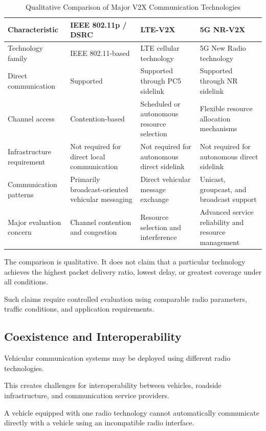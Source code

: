 \begin{table}[t]
\centering
\caption{Qualitative Comparison of Major V2X Communication Technologies}
\label{tab:v2x_technology_comparison}
\footnotesize
\begin{tabular}{|p{3.0cm}|p{4.0cm}|p{4.0cm}|p{4.0cm}|}
\hline
\textbf{Characteristic} &
\textbf{IEEE 802.11p / DSRC} &
\textbf{LTE-V2X} &
\textbf{5G NR-V2X} \\
\hline
Technology family &
IEEE 802.11-based &
LTE cellular technology &
5G New Radio technology \\
\hline
Direct communication &
Supported &
Supported through PC5 sidelink &
Supported through NR sidelink \\
\hline
Channel access &
Contention-based &
Scheduled or autonomous resource selection &
Flexible resource allocation mechanisms \\
\hline
Infrastructure requirement &
Not required for direct local communication &
Not required for autonomous direct sidelink &
Not required for autonomous direct sidelink \\
\hline
Communication patterns &
Primarily broadcast-oriented vehicular messaging &
Direct vehicular message exchange &
Unicast, groupcast, and broadcast support \\
\hline
Major evaluation concern &
Channel contention and congestion &
Resource selection and interference &
Advanced service reliability and resource management \\
\hline
\end{tabular}
\end{table}

The comparison is qualitative.
It does not claim that a
particular technology
achieves the highest
packet delivery ratio,
lowest delay, or
greatest coverage
under all conditions.

Such claims require
controlled evaluation
using comparable
radio parameters,
traffic conditions,
and application
requirements.

\subsection{Coexistence and Interoperability}

Vehicular communication
systems may be deployed
using different radio
technologies.

This creates challenges
for interoperability
between vehicles,
roadside infrastructure,
and communication
service providers.

A vehicle equipped
with one radio
technology cannot
automatically communicate
directly with a vehicle
using an incompatible
radio interface.

